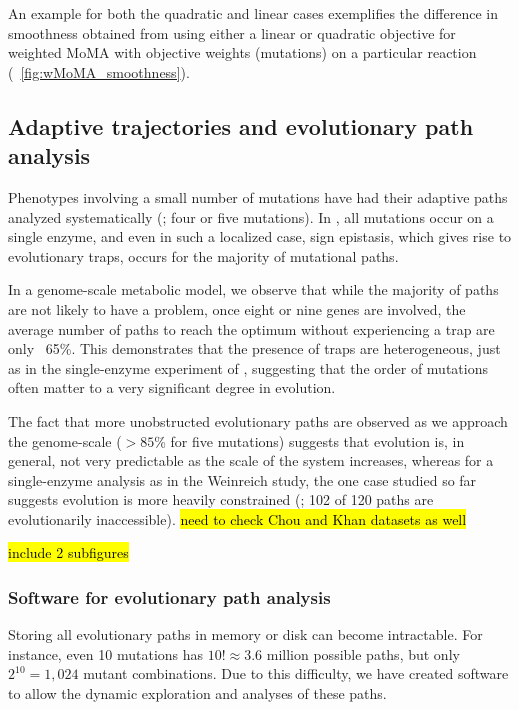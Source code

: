 An example for both the quadratic and linear cases exemplifies the
difference in smoothness obtained from using either a linear or
quadratic objective for weighted MoMA with objective weights (mutations)
on a particular reaction (\Fig~\ref{fig:wMoMA_smoothness}).


\subsection{Adaptive trajectories and evolutionary path analysis}

Phenotypes involving a small number of mutations have had their
adaptive paths analyzed systematically (\citep{Poelwijk2007,Weinreich2006, 
Khan2011, Chou2011}; four or five mutations). In \citet{Weinreich2006}, all
mutations occur on a single enzyme, and even in such a localized case,
sign epistasis, which gives rise to evolutionary traps, occurs for the
majority of mutational paths.

In a genome-scale metabolic model, we observe that while the majority
of paths are not likely to have a problem, once eight or nine genes are
involved, the average number of paths to reach the optimum without
experiencing a trap are only ~65\%. This demonstrates that the
presence of traps are heterogeneous, just as in the single-enzyme
experiment of \citet{Weinreich2006}, suggesting that the order of
mutations often matter to a very significant degree in evolution.

The fact that more unobstructed evolutionary paths are observed as we
approach the genome-scale ($> 85$\% for five mutations) suggests that
evolution is, in general, not very predictable as the scale of the
system increases, whereas for a single-enzyme analysis as in the
Weinreich study, the one case studied so far suggests evolution is
more heavily constrained (\citep{Weinreich2006}; 102 of 120 paths are
evolutionarily inaccessible).
\hl{need to check Chou and Khan datasets as well}


\hl{include 2 subfigures}

\subsubsection{Software for evolutionary path analysis}

Storing all evolutionary paths in memory or disk can become 
intractable. For instance, even 10 mutations has $10! \approx
3.6$ million possible paths, but only $2^{10} = 1,024$ mutant
combinations. Due to this difficulty, we have created software to allow 
the dynamic exploration and analyses of these paths. 

